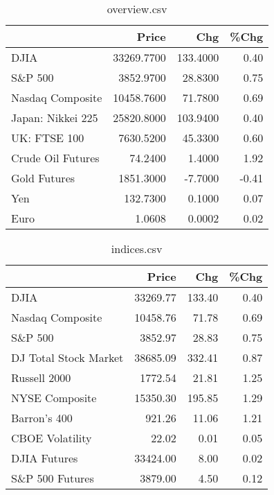 \documentclass{article}%
\begin{document}
\begin{table}[htbp]%
\caption{overview.csv}%
\centering%
\begin{adjustbox}{width=1\textwidth}%
\begin{tabular}{lrrr}
\toprule
                  &      Price &      Chg &  \%Chg \\
\midrule
             DJIA & 33269.7700 & 133.4000 &  0.40 \\
          S\&P 500 &  3852.9700 &  28.8300 &  0.75 \\
 Nasdaq Composite & 10458.7600 &  71.7800 &  0.69 \\
Japan: Nikkei 225 & 25820.8000 & 103.9400 &  0.40 \\
     UK: FTSE 100 &  7630.5200 &  45.3300 &  0.60 \\
Crude Oil Futures &    74.2400 &   1.4000 &  1.92 \\
     Gold Futures &  1851.3000 &  -7.7000 & -0.41 \\
              Yen &   132.7300 &   0.1000 &  0.07 \\
             Euro &     1.0608 &   0.0002 &  0.02 \\
\bottomrule
\end{tabular}
%
\end{adjustbox}%
\end{table}

%


\begin{table}[htbp]%
\caption{indices.csv}%
\centering%
\begin{adjustbox}{width=1\textwidth}%
\begin{tabular}{lrrr}
\toprule
                      &    Price &    Chg &  \%Chg \\
\midrule
                 DJIA & 33269.77 & 133.40 &  0.40 \\
     Nasdaq Composite & 10458.76 &  71.78 &  0.69 \\
              S\&P 500 &  3852.97 &  28.83 &  0.75 \\
DJ Total Stock Market & 38685.09 & 332.41 &  0.87 \\
         Russell 2000 &  1772.54 &  21.81 &  1.25 \\
       NYSE Composite & 15350.30 & 195.85 &  1.29 \\
         Barron's 400 &   921.26 &  11.06 &  1.21 \\
      CBOE Volatility &    22.02 &   0.01 &  0.05 \\
         DJIA Futures & 33424.00 &   8.00 &  0.02 \\
      S\&P 500 Futures &  3879.00 &   4.50 &  0.12 \\
\bottomrule
\end{tabular}
%
\end{adjustbox}%
\end{table}
\end{document}
